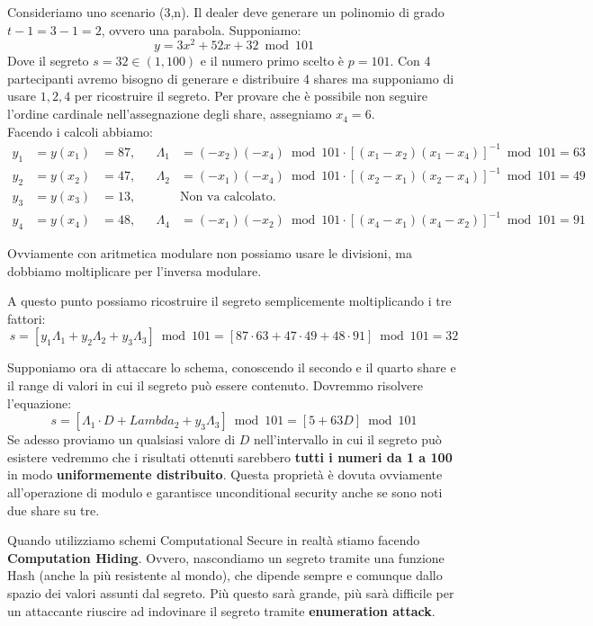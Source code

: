 \begin{example}\label{exam:shamirmodular}
Consideriamo uno scenario (3,n). Il dealer deve generare un polinomio di grado $t-1=3-1=2$, ovvero una parabola. Supponiamo: \[y=3 x^2+52 x+32
   \bmod 101\]
Dove il segreto $s=32\in(1,100)$ e il numero primo scelto è $p=101$. Con 4 partecipanti avremo bisogno di generare e distribuire 4 shares ma supponiamo di usare $1,2,4$ per ricostruire il segreto. Per provare che è possibile non seguire l'ordine cardinale nell'assegnazione degli share, assegniamo $x_4=6$.\\
Facendo i calcoli abbiamo:
\begin{equation*}
    \begin{aligned}
    y_1&=y(x_1)&=87,    &&  \Lambda_1&=(-x_2)(-x_4)\bmod101\cdot[(x_1-x_2)(x_1-x_4)]^{-1}\bmod101=63\\
    y_2&=y(x_2)&=47,    &&  \Lambda_2&=(-x_1)(-x_4)\bmod101\cdot[(x_2-x_1)(x_2-x_4)]^{-1}\bmod101=49\\
    y_3&=y(x_3)&=13,    &&  &\text{Non va calcolato.}\\
    y_4&=y(x_4)&=48,    &&  \Lambda_4&=(-x_1)(-x_2)\bmod101\cdot[(x_4-x_1)(x_4-x_2)]^{-1}\bmod101=91
    \end{aligned}
\end{equation*}
\begin{remark}
Ovviamente con aritmetica modulare non possiamo usare le divisioni, ma dobbiamo moltiplicare per l'inversa modulare.
\end{remark}
A questo punto possiamo ricostruire il segreto semplicemente moltiplicando i tre fattori:
\[
s=[y_1\Lambda_1+y_2\Lambda_2+y_3\Lambda_3]\bmod101=[87\cdot63+47\cdot49+48\cdot91]\bmod101=32
\]
\begin{remark}
Supponiamo ora di attaccare lo schema, conoscendo il secondo e il quarto share e il range di valori in cui il segreto può essere contenuto. Dovremmo risolvere l'equazione:
\[s=[\Lambda_1\cdot D+Lambda_2+y_3\Lambda_3]\bmod101=[5+63D]\bmod101\]
Se adesso proviamo un qualsiasi valore di $D$ nell'intervallo in cui il segreto può esistere vedremmo che i risultati ottenuti sarebbero \textbf{tutti i numeri da 1 a 100} in modo \textbf{uniformemente distribuito}. Questa proprietà è dovuta ovviamente all'operazione di modulo e garantisce unconditional security anche se sono noti due share su tre. 
\end{remark}
\end{example}
\begin{remark}
Quando utilizziamo schemi Computational Secure in realtà stiamo facendo \textbf{Computation Hiding}. Ovvero, nascondiamo un segreto tramite una funzione Hash (anche la più resistente al mondo), che dipende sempre e comunque dallo spazio dei valori assunti dal segreto. Più questo sarà grande, più sarà difficile per un attaccante riuscire ad indovinare il segreto tramite \textbf{enumeration attack}.
\end{remark}

